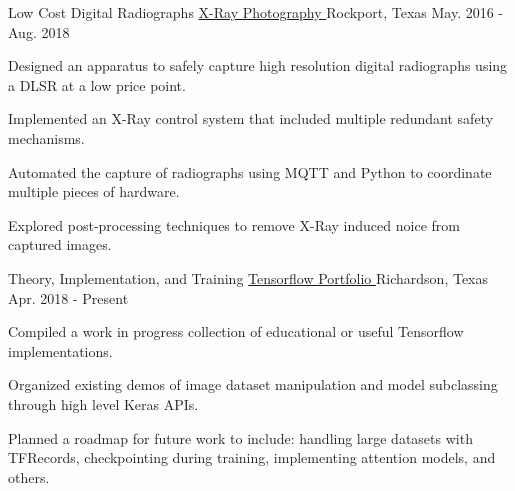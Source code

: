 

\begin{cventries}
  \cventry
    {Low Cost Digital Radiographs} %
		{
			\href{https://github.com/TidalPaladin/xray-controller.git}
			{X-Ray Photography \faGithubSquare}
		} %
    {Rockport, Texas} %
    {May. 2016 - Aug. 2018} %
	{
	\begin{cvitems}
		\item {
			Designed an apparatus to safely capture high resolution
			digital radiographs using a DLSR at
			a low price point.
		}
		\item {
			Implemented an X-Ray control system that included multiple
			redundant safety mechanisms.
		}
		\item {
			Automated the capture of radiographs using MQTT and Python
			to coordinate multiple pieces of hardware.
		}
		\item {
			Explored post-processing techniques to remove X-Ray induced
			noice from captured images.
		}
	\end{cvitems}
	}

  \cventry
  	{Theory, Implementation, and Training} %
		{
			\href{https://github.com/TidalPaladin/tensorflow-demos}
			{Tensorflow Portfolio \faGithubSquare}
		} %
    {Richardson, Texas} %
    {Apr. 2018 - Present} %
	{
	\begin{cvitems}
		\item {
			Compiled a work in progress collection of educational or useful
			Tensorflow implementations.
		}
		\item {
			Organized existing demos of image dataset manipulation and model
			subclassing through high level Keras APIs.
		}
		\item {
			Planned a roadmap for future work to include: handling large
			datasets with TFRecords, checkpointing during training,
			\newline
			implementing attention models, and others.
		}
	\end{cvitems}
	}


\end{cventries}
